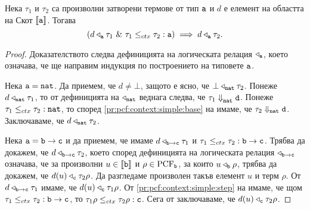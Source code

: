 \begin{proposition}\label{pr:pcf:context:relation}
  Нека $\tau_1$ и $\tau_2$ са произволни затворени термове от тип $\texttt{a}$ и $d$ е елемент на областта на Скот $\llbracket{\texttt{a}}\rrbracket$. Тогава
  \[(d \triangleleft_{\texttt{a}} \tau_1\ \&\ \tau_1 \leq_{ctx} \tau_2 : \texttt{a}) \implies d \triangleleft_{\texttt{a}} \tau_2.\]
\end{proposition}
\begin{proof}
  Доказателството следва дефиницията на логическата релация $\triangleleft_{\texttt{a}}$, което означава, че
  ще направим индукция по построението на типовете $\texttt{a}$.

  Нека $\texttt{a} = \texttt{nat}$.
  Да приемем, че $d \neq \bot$, защото е ясно, че $\bot \triangleleft_{\texttt{nat}} \tau_2$.
  Понеже $d \triangleleft_{\texttt{nat}} \tau_1$, то от дефиницията на $\triangleleft_{\texttt{nat}}$ веднага следва, че $\tau_1 \Downarrow^{}_{\texttt{nat}} \texttt{d}$.
  Понеже $\tau_1 \leq_{ctx} \tau_2 : \texttt{nat}$, то според \ref{pr:pcf:context:simple:base} на  имаме, че $\tau_2 \Downarrow_{\texttt{nat}} \texttt{d}$. Заключаваме, че $d \triangleleft_{\texttt{nat}} \tau_2$.
  
  Нека $\texttt{a} = \texttt{b}\to\texttt{c}$ и да приемем, че имаме $d \triangleleft_{\texttt{b}\to\texttt{c}} \tau_1$ и $\tau_1 \leq_{ctx} \tau_2 : \texttt{b}\to\texttt{c}$.
  Трябва да докажем, че $d \triangleleft_{\texttt{b}\to\texttt{c}} \tau_2$, което според дефиницията на логическата релация $\triangleleft_{\texttt{b}\to\texttt{c}}$ означава,
  че за произволни $u \in \llbracket{\texttt{b}}\rrbracket$ и $\rho \in \text{PCF}_{\texttt{b}}$, за които $u \triangleleft_{\texttt{b}} \rho$, трябва да докажем, че $d(u) \triangleleft_{\texttt{c}} \tau_2\rho$.
  Да разгледаме произволен такъв елемент $u$ и терм $\rho$. 
  От $d \triangleleft_{\texttt{b} \to \texttt{c}} \tau_1$ имаме, че $d(u) \triangleleft_{\texttt{c}} \tau_1 \rho$.
  От \ref{pr:pcf:context:simple:step} на  имаме, че щом $\tau_1 \leq_{ctx} \tau_2 : \texttt{b} \to \texttt{c}$, то $\tau_1 \rho \leq_{ctx} \tau_2 \rho : \texttt{c}$.
  Сега от \IndHyp заключаваме, че $d(u) \triangleleft_{\texttt{c}} \tau_2 \rho$.
\end{proof}

